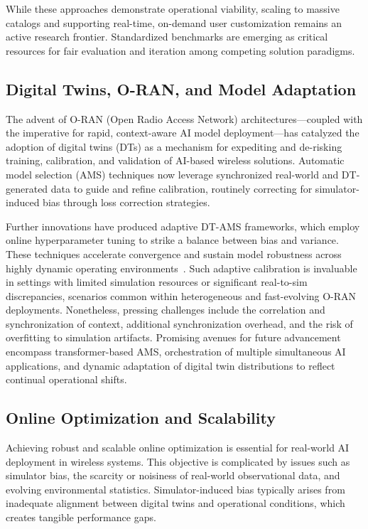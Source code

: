 \documentclass[sigconf]{acmart}
\begin{document}
While these approaches demonstrate operational viability, scaling to massive catalogs and supporting real-time, on-demand user customization remains an active research frontier. Standardized benchmarks are emerging as critical resources for fair evaluation and iteration among competing solution paradigms.

\subsection{Digital Twins, O-RAN, and Model Adaptation}

The advent of O-RAN (Open Radio Access Network) architectures—coupled with the imperative for rapid, context-aware AI model deployment—has catalyzed the adoption of digital twins (DTs) as a mechanism for expediting and de-risking training, calibration, and validation of AI-based wireless solutions. Automatic model selection (AMS) techniques now leverage synchronized real-world and DT-generated data to guide and refine calibration, routinely correcting for simulator-induced bias through loss correction strategies.

Further innovations have produced adaptive DT-AMS frameworks, which employ online hyperparameter tuning to strike a balance between bias and variance. These techniques accelerate convergence and sustain model robustness across highly dynamic operating environments~\cite{ref37}. Such adaptive calibration is invaluable in settings with limited simulation resources or significant real-to-sim discrepancies, scenarios common within heterogeneous and fast-evolving O-RAN deployments. Nonetheless, pressing challenges include the correlation and synchronization of context, additional synchronization overhead, and the risk of overfitting to simulation artifacts. Promising avenues for future advancement encompass transformer-based AMS, orchestration of multiple simultaneous AI applications, and dynamic adaptation of digital twin distributions to reflect continual operational shifts.

\subsection{Online Optimization and Scalability}

Achieving robust and scalable online optimization is essential for real-world AI deployment in wireless systems. This objective is complicated by issues such as simulator bias, the scarcity or noisiness of real-world observational data, and evolving environmental statistics. Simulator-induced bias typically arises from inadequate alignment between digital twins and operational conditions, which creates tangible performance gaps.
\end{document}

